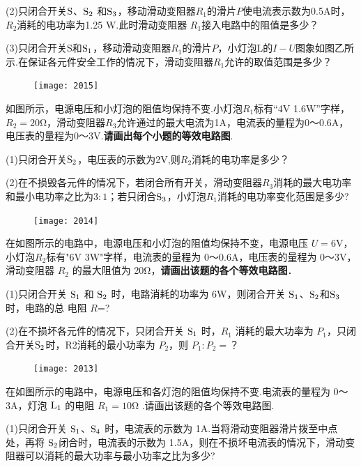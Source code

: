 \documentclass[11pt,a4paper]{article}
\newcommand{\nianfen}[1]{\hspace{-2em}{(#1\textbf{·}\textit{青岛})}}
\begin{document}
	(2)只闭合开关$\rm S $、$\rm S_2 $ 和$\rm S_3 $，移动滑动变阻器$ R_1 $的滑片$ P $使电流表示数为0.5A时，$ R_2 $消耗的电功率为1.25 W.此时滑动变阻器 $ R_1 $接入电路中的阻值是多少？
	
	(3)只闭合开关S和$\rm S_1 $，移动滑动变阻器$ R_1 $的滑片$ P $，小灯泡L的$ I-U $图象如图乙所示.在保证各元件安全工作的情况下，滑动变阻器$ R_1 $允许的取值范围是多少？
	\clearpage
	
	\begin{figure}
		\texttt{[image: 2015]}
	\end{figure}

	\nianfen{2015}如图所示，电源电压和小灯泡的阻值均保持不变.小灯泡$ R_1 $标有“4V 1.6W”字样，$ R_2=20$Ω，滑动变阻器$ R_3 $允许通过的最大电流为1A，电流表的量程为0～0.6A，电压表的量程为0～3V.\textbf{请画出每个小题的等效电路图}.

	(1)只闭合开关$\rm S_2 $，电压表的示数为2V,则$R_2$消耗的电功率是多少？
	
	(2)在不损毁各元件的情况下，若闭合所有开关，滑动变阻器$R_3$消耗的最大电功率和最小电功率之比为$3:1$；若只闭合$\rm S_3$，小灯泡$R_1$消耗的电功率变化范围是多少?
	\clearpage
	
	\begin{figure}
	\texttt{[image: 2014]}
	\end{figure}

	\nianfen{2014}在如图所示的电路中，电源电压和小灯泡的阻值均保持不变，电源电压 $ U=6 $V，小灯泡$ R_2 $标有"6V  3W"字样，电流表的量程为 0～0.6A，电压表的量程为 0～3V，滑动变阻器 $ R_2 $ 的最大阻值为 20Ω，\textbf{请画出该题的各个等效电路图}．
	
	(1)只闭合开关 $\rm S_1 $ 和 $\rm S_2 $ 时，电路消耗的功率为 6W，则闭合开关 $\rm S_1 $、$\rm S_2 $和$\rm S_3 $时，电路的总
	电阻 $ R $=?
	
	(2)在不损坏各元件的情况下，只闭合开关 $\rm S_1 $ 时，$ R_1 $ 消耗的最大功率为 $ P_1 $，只闭合开关$\rm S_2 $时，R2消耗的最小功率为 $ P_2 $，则 $ P_1:P_2= $？
	\clearpage
	
	\begin{figure}
		\texttt{[image: 2013]}
	\end{figure}
	
	\nianfen{2013}在如图所示的电路中，电源电压和各灯泡的阻值均保持不变.电流表的量程为 0～3A，灯泡 $\rm L_1 $ 的电阻 $ R_1=10 $Ω .请画出该题的各个等效电路图.
	
	(1)只闭合开关 $\rm S_1 $、$\rm S_4 $ 时，电流表的示数为 1A.当将滑动变阻器滑片拨至中点处，再将 $\rm S_2 $闭合时，电流表的示数为 1.5A，则在不损坏电流表的情况下，滑动变阻器可以消耗的最大功率与最小功率之比为多少?
	
\end{document}
